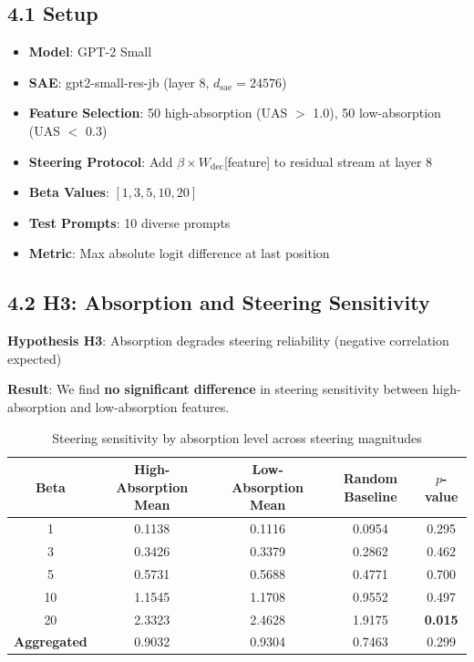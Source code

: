 \documentclass{article}
\begin{document}
\subsection{4.1 Setup}

\begin{itemize}
    \item \textbf{Model}: GPT-2 Small
    \item \textbf{SAE}: gpt2-small-res-jb (layer 8, $d_{\text{sae}} = 24576$)
    \item \textbf{Feature Selection}: 50 high-absorption (UAS $>$ 1.0), 50 low-absorption (UAS $<$ 0.3)
    \item \textbf{Steering Protocol}: Add $\beta \times W_{\text{dec}}$[feature] to residual stream at layer 8
    \item \textbf{Beta Values}: $[1, 3, 5, 10, 20]$
    \item \textbf{Test Prompts}: 10 diverse prompts
    \item \textbf{Metric}: Max absolute logit difference at last position
\end{itemize}

\subsection{4.2 H3: Absorption and Steering Sensitivity}

\textbf{Hypothesis H3}: Absorption degrades steering reliability (negative correlation expected)

\textbf{Result}: We find \textbf{no significant difference} in steering sensitivity between high-absorption and low-absorption features.

\begin{table}[htbp]
\caption{Steering sensitivity by absorption level across steering magnitudes}
\label{tab:h3-results}
\centering
\begin{tabular}{ccccc}
\toprule
Beta & High-Absorption Mean & Low-Absorption Mean & Random Baseline & $p$-value \\
\midrule
1 & 0.1138 & 0.1116 & 0.0954 & 0.295 \\
3 & 0.3426 & 0.3379 & 0.2862 & 0.462 \\
5 & 0.5731 & 0.5688 & 0.4771 & 0.700 \\
10 & 1.1545 & 1.1708 & 0.9552 & 0.497 \\
20 & 2.3323 & 2.4628 & 1.9175 & \textbf{0.015} \\
\midrule
\textbf{Aggregated} & 0.9032 & 0.9304 & 0.7463 & 0.299 \\
\bottomrule
\end{tabular}
\end{table}
\end{document}
